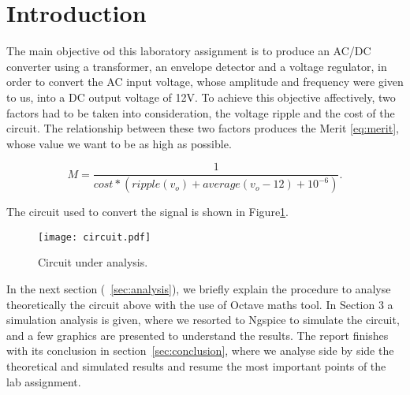 \section{Introduction}
\label{sec:introduction}

\par The main objective od this laboratory assignment is to produce an AC/DC converter using a transformer, an envelope detector and a voltage regulator, in order to convert the AC input voltage, whose amplitude and frequency were given to us, into a DC output voltage of 12V. To achieve this objective affectively, two factors had to be taken into consideration, the voltage ripple and the cost of the circuit. The relationship between these two factors produces the Merit \ref{eq:merit}, whose value we want to be as high as possible. 

\begin{equation}
  M = \frac {1}{cost*(ripple(v_{o}) + average(v_{o} - 12) + 10^{-6})}.
  \label{eq:merit}
\end{equation}


\par The circuit used to convert the signal is shown in Figure\ref{fig:circuit}.

\begin{figure}[h] \centering
\texttt{[image: circuit.pdf]}
\caption{Circuit under analysis.}
\label{fig:circuit}
\end{figure}


\par In the next section (~\ref{sec:analysis}), we briefly explain the procedure to analyse theoretically the circuit above with the use of Octave maths tool. In Section 3 a simulation analysis is given, where we resorted to Ngspice to simulate the circuit, and a few graphics are presented to understand the results. The report finishes with its conclusion in section~\ref{sec:conclusion}, where we analyse side by side the theoretical and simulated results and resume the most important points of the lab assignment.

\newpage
